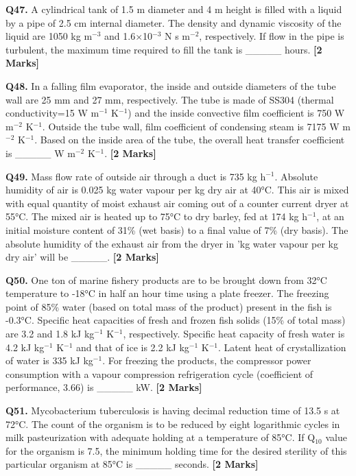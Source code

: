 \documentclass[11pt]{article}
\newcommand{\questionb}[2]{
    \noindent\textbf{Q#2.} #1 \hfill \textbf{[2 Marks]}
}
\begin{document}
\questionb{A cylindrical tank of 1.5 m diameter and 4 m height is filled with a liquid by a pipe of 2.5 cm internal diameter. The density and dynamic viscosity of the liquid are 1050 kg m\(^{-3}\) and 1.6×10\(^{-3}\) N s m\(^{-2}\), respectively. If flow in the pipe is turbulent, the maximum time required to fill the tank is \_\_\_\_\_ hours.}{47}
\vspace{0.5cm}

\questionb{In a falling film evaporator, the inside and outside diameters of the tube wall are 25 mm and 27 mm, respectively. The tube is made of SS304 (thermal conductivity=15 W m\(^{-1}\) K\(^{-1}\)) and the inside convective film coefficient is 750 W m\(^{-2}\) K\(^{-1}\). Outside the tube wall, film coefficient of condensing steam is 7175 W m\(^{-2}\) K\(^{-1}\). Based on the inside area of the tube, the overall heat transfer coefficient is \_\_\_\_\_ W m\(^{-2}\) K\(^{-1}\).}{48}
\vspace{0.5cm}

\questionb{Mass flow rate of outside air through a duct is 735 kg h\(^{-1}\). Absolute humidity of air is 0.025 kg water vapour per kg dry air at 40°C. This air is mixed with equal quantity of moist exhaust air coming out of a counter current dryer at 55°C. The mixed air is heated up to 75°C to dry barley, fed at 174 kg h\(^{-1}\), at an initial moisture content of 31\% (wet basis) to a final value of 7\% (dry basis). The absolute humidity of the exhaust air from the dryer in 'kg water vapour per kg dry air' will be \_\_\_\_\_.}{49}
\vspace{0.5cm}

\questionb{One ton of marine fishery products are to be brought down from 32°C temperature to -18°C in half an hour time using a plate freezer. The freezing point of 85\% water (based on total mass of the product) present in the fish is -0.3°C. Specific heat capacities of fresh and frozen fish solids (15\% of total mass) are 3.2 and 1.8 kJ kg\(^{-1}\) K\(^{-1}\), respectively. Specific heat capacity of fresh water is 4.2 kJ kg\(^{-1}\) K\(^{-1}\) and that of ice is 2.2 kJ kg\(^{-1}\) K\(^{-1}\). Latent heat of crystallization of water is 335 kJ kg\(^{-1}\). For freezing the products, the compressor power consumption with a vapour compression refrigeration cycle (coefficient of performance, 3.66) is \_\_\_\_\_ kW.}{50}
\vspace{0.5cm}

\questionb{Mycobacterium tuberculosis is having decimal reduction time of 13.5 s at 72°C. The count of the organism is to be reduced by eight logarithmic cycles in milk pasteurization with adequate holding at a temperature of 85°C. If Q\(_{10}\) value for the organism is 7.5, the minimum holding time for the desired sterility of this particular organism at 85°C is \_\_\_\_\_ seconds.}{51}
\vspace{0.5cm}
\end{document}
